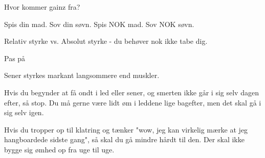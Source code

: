 \begin{multicols}{2}

  \begin{tList}{Hvor kommer gainz fra?}

  \item Spis din mad. Sov din søvn. Spis NOK mad. Sov NOK søvn.
  \item Relativ styrke vs. Absolut styrke - du behøver nok ikke tabe dig.
  \end{tList}

  \begin{tList}{Pas på}
  \item Sener styrkes markant langsommere end muskler.

  \item Hvis du begynder at få ondt i led eller sener, og smerten
    ikke går i sig selv dagen efter, så stop. Du må gerne være lidt
    øm i leddene lige bagefter, men det skal gå i sig selv igen.

  \item Hvis du tropper op til klatring og tænker "wow, jeg kan
    virkelig mærke at jeg hangboardede sidste gang", så skal du gå
    mindre hårdt til den. Der skal ikke bygge sig ømhed op fra uge til uge.
  \end{tList}



\end{multicols}
